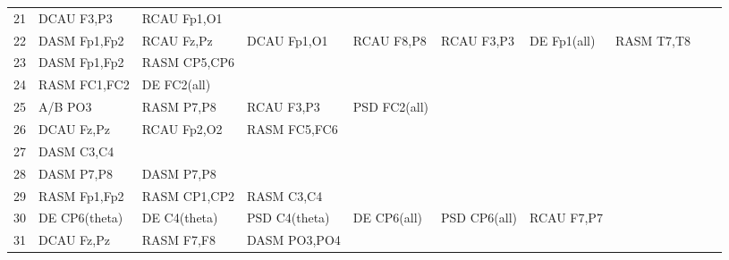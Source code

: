 \begin{landscape}
\begin{table}[]
\begin{tabular}{l|llllllll}
21       & DCAU F3,P3     & RCAU Fp1,O1    &                &                &                &                &               &                &               &               \\
22       & DASM Fp1,Fp2   & RCAU Fz,Pz     & DCAU Fp1,O1    & RCAU F8,P8     & RCAU F3,P3     & DE Fp1(all)    & RASM T7,T8    &                &               &               \\
23       & DASM Fp1,Fp2   & RASM CP5,CP6   &                &                &                &                &               &                &               &               \\
24       & RASM FC1,FC2   & DE FC2(all)    &                &                &                &                &               &                &               &               \\
25       & A/B PO3        & RASM P7,P8     & RCAU F3,P3     & PSD FC2(all)   &                &                &               &                &               &               \\
26       & DCAU Fz,Pz     & RCAU Fp2,O2    & RASM FC5,FC6   &                &                &                &               &                &               &               \\
27       & DASM C3,C4     &                &                &                &                &                &               &                &               &               \\
28       & DASM P7,P8     & DASM P7,P8     &                &                &                &                &               &                &               &               \\
29       & RASM Fp1,Fp2   & RASM CP1,CP2   & RASM C3,C4     &                &                &                &               &                &               &               \\
30       & DE CP6(theta)  & DE C4(theta)   & PSD C4(theta)  & DE CP6(all)    & PSD CP6(all)   & RCAU F7,P7     &               &                &               &               \\
31       & DCAU Fz,Pz     & RASM F7,F8     & DASM PO3,PO4   &                &                &                &               &                &               &               \\
\end{tabular}
\end{table}
\end{landscape}
\clearpage
